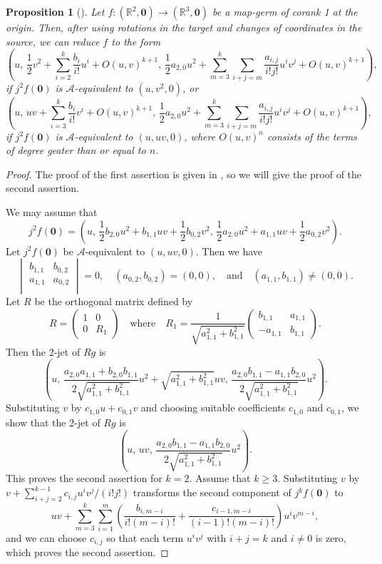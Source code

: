 \documentclass[12pt]{amsart}
\theoremstyle{plain}
\newtheorem{proposition}[theorem]{Proposition}
\theoremstyle{definition}
\newcommand{\R}{\mathbb{R}}
\renewcommand{\geq}{\geqslant}
\newcommand{\ma}{\mathcal{A}}
\begin{document}
\begin{proposition}[\cite{FH2025}]
\label{prop:normal_form}
Let $f\colon(\R^2,\bm{0})\to(\R^3,\bm{0})$ be a map-germ of corank 1 at the origin. 
Then, after using rotations in the target and changes of coordinates in the source, we can reduce $f$ to the form
\begin{equation*}
\left(u,\, \frac12 v^2 + \sum_{i=2}^k \frac{b_i}{i!} u^i + O(u,v)^{k+1},\,  \frac12 a_{2,0} u^2 + \sum_{m=3}^k\sum_{i+j=m} \frac{a_{i,j}}{i!j!}u^i v^j + O(u,v)^{k+1}\right),
\end{equation*}
if $j^2 f(\bm{0})$ is $\ma$-equivalent to $(u,v^2,0)$, or
\begin{equation}
\label{eq:normal_form_2}
\left(u,\, u v + \sum_{i=3}^k \frac{b_i}{i!} v^i + O(u,v)^{k+1},\, \frac12 a_{2,0} u^2 + \sum_{m=3}^k\sum_{i+j=m} \frac{a_{i,j}}{i!j!} u^i v^j + O(u,v)^{k+1}\right), 
\end{equation}
if $j^2 f(\bm{0})$ is $\ma$-equivalent to $(u,u v,0)$, where $O(u,v)^n$ consists of the terms of degree geater than or equal to $n$.
\end{proposition}
\begin{proof}
The proof of the first assertion is given in \cite{FH2025}, so we will give the proof of the second assertion.
 
We may assume that
 \[
j^2f(\bm{0}) = \left(u,\, \frac12 b_{2,0} u^2 + b_{1,1} u v + \frac12 b_{0,2} v^2,\, \frac12 a_{2,0} u^2 + a_{1,1} u v + \frac12 a_{0,2} v^2 \right).
\]
Let $j^2 f(\bm{0})$ be $\mathcal{A}$-equivalent to $(u,u v,0)$.
Then we have 
\[
\begin{vmatrix}
b_{1,1} & b_{0,2}\\
a_{1,1} & a_{0,2}\\
\end{vmatrix} = 0,
\quad (a_{0,2},b_{0,2})=(0,0), \quad \mbox{and} \quad (a_{1,1},b_{1,1})\ne(0,0).
\]
Let $R$ be the orthogonal matrix defined by 
\[
R=
\begin{pmatrix}
1 & 0 \\
0 & R_1
\end{pmatrix}
\quad\text{where}\quad
R_1 = \frac1{\sqrt{a_{1,1}^2 + b_{1,1}^2}}
\begin{pmatrix}
b_{1,1} & a_{1,1}\\
-a_{1,1} & b_{1,1}
\end{pmatrix}.
\]
Then the 2-jet of $R g$ is 
\[
\left(u,\, \dfrac{a_{2,0}a_{1,1}+b_{2,0}b_{1,1}}{2\sqrt{a_{1,1}^2+b_{1,1}^2}}u^2 + \sqrt{a_{1,1}^2+b_{1,1}^2}u v,\, \dfrac{a_{2,0}b_{1,1}-a_{1,1}b_{2,0}}{2\sqrt{a_{1,1}^2+b_{1,1}^2}}u^2\right).
\]
Substituting $v$ by $c_{1,0} u + c_{0,1} v$ and choosing suitable coefficients $c_{1,0}$ and $c_{0,1}$, we show that the 2-jet of $R g$ is
\[
\left(u,\, u v,\, \dfrac{a_{2,0}b_{1,1}-a_{1,1}b_{2,0}}{2\sqrt{a_{1,1}^2+b_{1,1}^2}}u^2\right). 
\]
This proves the second assertion for $k=2$.
Assume that $k\geq 3$.
Substituting $v$ by $v + \sum_{i+j=2}^{k-1} c_{i,j} u^i v^j/(i!j!)$ transforms the second component of $j^k f(\bm{0})$ to 
\[
u v + \sum_{m=3}^k \sum_{i=1}^m\left(\dfrac{b_{i,m-i}}{i!(m-i)!} + \dfrac{c_{i-1,m-i}}{(i-1)!(m-i)!}\right) u^i v^{m-i},
\]
and we can choose $c_{i,j}$ so that each term $u^iv^j$ with $i+j=k$ and $i\neq0$ is zero, which proves the second assertion.
\end{proof}
\end{document}
